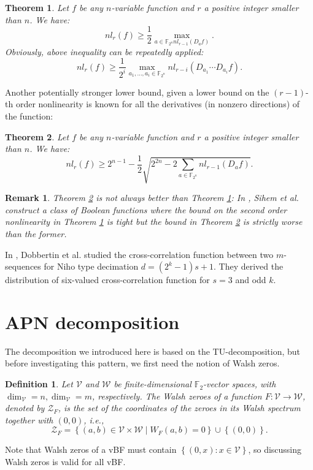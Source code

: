 \documentclass[8pt,oneside]{article}
\newcommand{\0}{\textbf{0}}
\newcommand{\1}{\textbf{1}}
\newcommand{\F}{\mathbb{F}}
\newtheorem{theorem}{Theorem}
\newtheorem{definition}{Definition}
\newtheorem{remark}{Remark}
\begin{document}
    \begin{theorem}\label{TH:NL_onederivate}
        Let $f$ be any $ n $-variable function and $ r $ a positive integer smaller than $ n $. We have:
        \[nl_r(f)\ge\frac{1}{2}\max_{a\in\F_{2^n}nl_{r-1}(D_af)}.\]
        Obviously, above inequality can be repeatedly applied: 
        \[nl_r(f)\ge \frac{1}{2^i}\max_{a_1,\dots,a_i\in\F_{2^n}}nl_{r-i}(D_{a_1}\cdots D_{a_i}f).\]
    \end{theorem}
    Another potentially stronger lower bound, given a lower bound on the $ (r-1) $-th order nonlinearity is 
    known for all the derivatives (in nonzero directions) of the function:
    \begin{theorem}\label{TH:NL_allderivates}
        Let $f$ be any $ n $-variable function and $ r $ a positive integer smaller than $ n $. We have:
        \[nl_r(f) \ge 2^{n-1} -\frac{1}{2}\sqrt{2^{2n}-2\sum_{a\in\F_{2^n}}nl_{r-1}(D_af)}.\]
    \end{theorem}
    \begin{remark}
        {\color{red}Theorem \ref{TH:NL_allderivates} is not always better than Theorem \ref{TH:NL_onederivate}}: 
        In \cite{SihemGJDK2017lowerbound_nl_2_notalwaysbetter}, Sihem et al. construct a class of Boolean functions where the bound on the second order nonlinearity in Theorem \ref{TH:NL_onederivate} is tight but the bound in Theorem \ref{TH:NL_allderivates} is strictly worse than the former. 
    \end{remark}
    
    In \cite{dobbertin2006niho_dickson_kloosterman}, Dobbertin et al. studied the cross-correlation function between two 
    $ m $-sequences for Niho type decimation $ d=(2^k-1)s+1 $. 
    They derived the distribution of six-valued cross-correlation function for $ s=3 $ and odd $ k $. 
    
\section{APN decomposition}
    The decomposition \cite{BeierleCLP2022ninebitAPNpermutation_error} we introduced here
    is based on the TU-decomposition, but before investigating this pattern, we first need the notion of Walsh zeros.
    \begin{definition}
        Let $ \mathcal{V} $ and $ \mathcal{W} $  be finite-dimensional $\F_2 $-vector spaces, 
        with $ \dim_{\mathcal{V}}=n,\dim_{\mathcal{V}}=m $, respectively. 
        The Walsh zeroes of a function $ F : \mathcal{V}\rightarrow \mathcal{W} $, denoted by $ \mathcal{Z}_F $, 
        is the set of the coordinates of the zeroes in its Walsh spectrum together with $ (0, 0) $, i.e.,
        \[\mathcal{Z}_F=\left\{ (a,b)\in\mathcal{V}\times\mathcal{W}\mid W_F(a,b)=0 \right\}\cup\left\{ (0,0) \right\}.\]
    \end{definition}
    Note that Walsh zeros of a vBF must contain $ \left\{ (0,x):x\in\mathcal{V} \right\} $, so discussing Walsh zeros 
    is valid for all vBF. 
    
\end{document}
